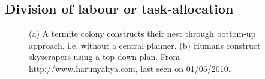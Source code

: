 \subsection{Division of labour or task-allocation}
\label{bg:def:dol}
\begin{figure}[H]
\centering
{} 
\hspace{0.25cm}
\caption{(a) A termite colony constructs their nest through bottom-up approach, i.e. without a central planner. (b) Humans construct skyscrapers using a top-down plan. From http://www.harunyahya.com, last seen on 01/05/2010.}
\label{fig:termite-nest}
\end{figure}

